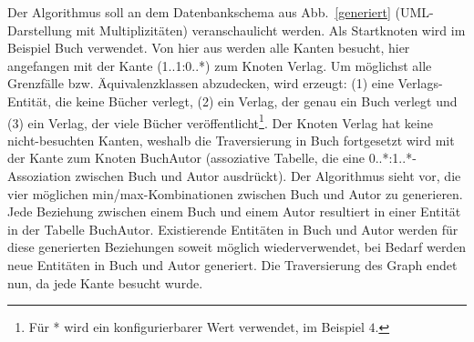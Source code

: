 	
Der Algorithmus soll an dem  Datenbankschema  aus Abb.~\ref{generiert} (UML-Darstellung mit Multiplizitäten) veranschaulicht werden. 
%
%	
%	
Als Startknoten wird im Beispiel Buch verwendet. 
%
Von hier aus werden alle Kanten besucht, hier angefangen mit der Kante (1..1:0..*) zum Knoten Verlag. 
%
%
Um möglichst alle Grenzfälle bzw. Äquivalenzklassen abzudecken, wird erzeugt: (1) eine Verlags-Entität, die keine Bücher verlegt, (2) ein Verlag, der genau ein Buch verlegt und (3) ein  Verlag, der viele
Bücher veröffentlicht\footnote{Für * wird ein konfigurierbarer Wert  verwendet, im Beispiel $4$.}.
%
%
%	
 Der Knoten Verlag hat keine nicht-besuchten Kanten, weshalb die Traversierung in Buch fortgesetzt wird mit der Kante zum Knoten BuchAutor (assoziative Tabelle, die eine 0..*:1..*-Assoziation zwischen Buch und Autor ausdrückt). 
%
%
%
Der Algorithmus sieht vor, die vier möglichen min/max-Kombinationen zwischen Buch und Autor zu generieren. 
%
Jede Beziehung zwischen einem Buch und einem Autor resultiert in einer Entität in der Tabelle BuchAutor. 
%
Existierende Entitäten in Buch und Autor werden für diese generierten Beziehungen soweit möglich wiederverwendet, bei Bedarf werden neue Entitäten in Buch und Autor generiert.
%
Die Traversierung des Graph endet nun, da jede Kante besucht wurde.
%
%
